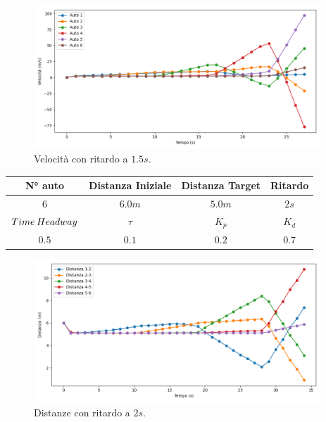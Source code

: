\begin{figure}[H]
    \includegraphics[width=0.96\textwidth]{images/5-experiment/delay/velocity_1,5+.png}
    \caption{Velocità con ritardo a $1.5 s$.}
    \label{fig:1.5-delay-velocity}
\end{figure}
\vspace*{\fill}
\newpage
\vspace*{\fill}
\begin{table}[h]
    \centering
    \begin{tabular}{|c|c|c|c|}
        \hline
        N° auto & Distanza Iniziale & Distanza Target & Ritardo \\
        \hline
        $6$ & $6.0 m$ & $5.0 m$ & $2 s$ \\
        \hline
        $Time\hspace{0.2em}Headway$ & $\tau$ & $K_p$ & $K_d$  \\
        \hline
        $0.5$ & $0.1$ & $0.2$ & $0.7$ \\
        \hline
    \end{tabular}
\end{table}

\begin{figure}[H]
    \includegraphics[width=0.96\textwidth]{images/5-experiment/delay/distance_2+.png}
    \caption{Distanze con ritardo a $2 s$.}
    \label{fig:2-delay-distance}
\end{figure}

